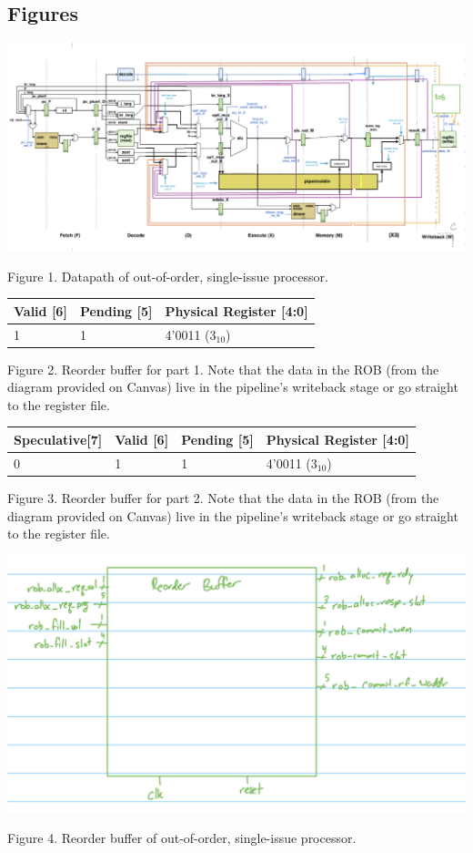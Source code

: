 \documentclass[11pt]{article}
\begin{document}
\subsection*{Figures}

\begin{center}
\includegraphics[scale=0.18]{../cpsc420-lab4/pv2ooo-datapath.jpg}
\end{center}
Figure 1. Datapath of out-of-order, single-issue processor.

\begin{center}
    \begin{tabular}{|p{1in}| p{1in}| p{1.5in} |} 
 \hline
  Valid [6] & Pending [5] & Physical Register [4:0] \\
 \hline
 \hline
  1 & 1 & 4'0011 ($3_{10}$) \\
 \hline

\end{tabular}
\end{center}
Figure 2. Reorder buffer for part 1. Note that the data in the ROB (from the diagram provided on Canvas) live in the pipeline's
writeback stage or go straight to the register file. \\

\begin{center}
    \begin{tabular}{|p{1in}| p{1in}| p{1in} | p{1.5in} |} 

 \hline
 Speculative[7] & Valid [6] & Pending [5] & Physical Register [4:0] \\
 \hline
 \hline
 0 & 1 & 1 & 4'0011 ($3_{10}$)   \\
 \hline

\end{tabular}
\end{center}
Figure 3. Reorder buffer for part 2. Note that the data in the ROB (from the diagram provided on Canvas) live in the pipeline's
writeback stage or go straight to the register file. \\

\begin{center}
\includegraphics[scale=0.18]{../cpsc420-lab4/pv2ooo-rob.jpg}
\end{center}
Figure 4. Reorder buffer of out-of-order, single-issue processor.
\end{document}
